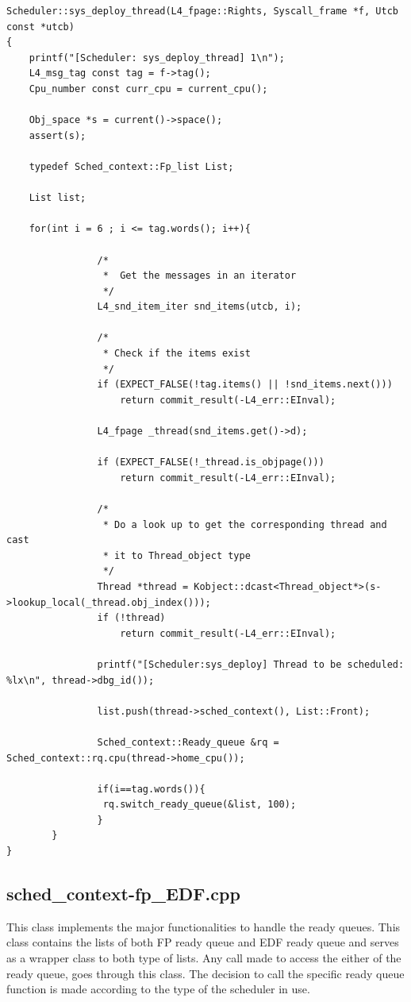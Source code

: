 \begin{lstlisting}[caption={Thread extraction and ready list creation},label=sysdeploycode, style=customcpp]
Scheduler::sys_deploy_thread(L4_fpage::Rights, Syscall_frame *f, Utcb const *utcb)
{
	printf("[Scheduler: sys_deploy_thread] 1\n");
	L4_msg_tag const tag = f->tag();
	Cpu_number const curr_cpu = current_cpu();

	Obj_space *s = current()->space();
	assert(s);

	typedef Sched_context::Fp_list List;

	List list;
	
	for(int i = 6 ; i <= tag.words(); i++){
				
				/*
				 *	Get the messages in an iterator
				 */
				L4_snd_item_iter snd_items(utcb, i);

				/*
				 * Check if the items exist
				 */
				if (EXPECT_FALSE(!tag.items() || !snd_items.next()))
					return commit_result(-L4_err::EInval);

				L4_fpage _thread(snd_items.get()->d);

				if (EXPECT_FALSE(!_thread.is_objpage()))
					return commit_result(-L4_err::EInval);

				/*
				 * Do a look up to get the corresponding thread and cast 
				 * it to Thread_object type
				 */
				Thread *thread = Kobject::dcast<Thread_object*>(s->lookup_local(_thread.obj_index()));
				if (!thread)
					return commit_result(-L4_err::EInval);

				printf("[Scheduler:sys_deploy] Thread to be scheduled: %lx\n", thread->dbg_id());

				list.push(thread->sched_context(), List::Front);

				Sched_context::Ready_queue &rq = Sched_context::rq.cpu(thread->home_cpu());

				if(i==tag.words()){
				 rq.switch_ready_queue(&list, 100);
				}
		}
}
\end{lstlisting}

\subsection{sched\_context-fp\_EDF.cpp}

This class implements the major functionalities to handle the ready queues. This class contains the lists of both FP ready queue and EDF ready queue and serves as a wrapper class to both type of lists. Any call made to access the either of the ready queue, goes through this class. The decision to call the specific ready queue function is made according to the type of the scheduler in use.

